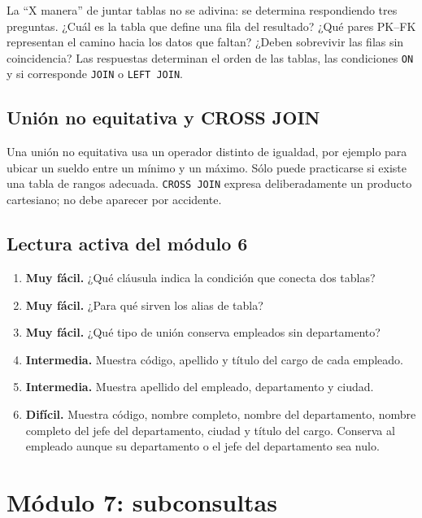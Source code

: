 \documentclass[11pt,a4paper]{article}
\newcommand{\campo}[1]{\texttt{#1}}
\newcommand{\nivel}[1]{\textbf{#1}}
\begin{document}
\begin{clave}
La ``X manera'' de juntar tablas no se adivina: se determina respondiendo tres preguntas. ¿Cuál es la
tabla que define una fila del resultado? ¿Qué pares PK--FK representan el camino hacia los datos que
faltan? ¿Deben sobrevivir las filas sin coincidencia? Las respuestas determinan el orden de las tablas,
las condiciones \campo{ON} y si corresponde \campo{JOIN} o \campo{LEFT JOIN}.
\end{clave}

\subsection{Unión no equitativa y CROSS JOIN}

Una unión no equitativa usa un operador distinto de igualdad, por ejemplo para ubicar un sueldo entre
un mínimo y un máximo. Sólo puede practicarse si existe una tabla de rangos adecuada.
\campo{CROSS JOIN} expresa deliberadamente un producto cartesiano; no debe aparecer por accidente.

\subsection{Lectura activa del módulo 6}

\begin{enumerate}[label=\textbf{M6.\arabic*}]
  \item \nivel{Muy fácil.} ¿Qué cláusula indica la condición que conecta dos tablas?
  \item \nivel{Muy fácil.} ¿Para qué sirven los alias de tabla?
  \item \nivel{Muy fácil.} ¿Qué tipo de unión conserva empleados sin departamento?
  \item \nivel{Intermedia.} Muestra código, apellido y título del cargo de cada empleado.
  \item \nivel{Intermedia.} Muestra apellido del empleado, departamento y ciudad.
  \item \nivel{Difícil.} Muestra código, nombre completo, nombre del departamento, nombre completo
  del jefe del departamento, ciudad y título del cargo. Conserva al empleado aunque su departamento
  o el jefe del departamento sea nulo.
\end{enumerate}

\section{Módulo 7: subconsultas}
\end{document}
